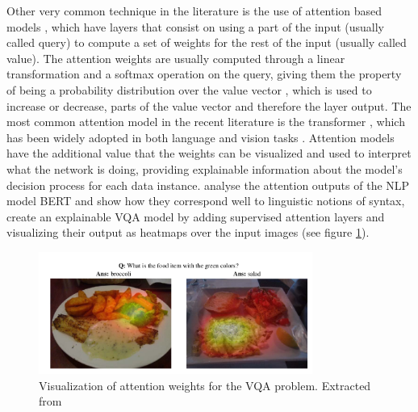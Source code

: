 Other very common technique in the literature is the use of attention based models \cite{bahdanau_attention},
which have layers that consist on using a part of the input (usually called query) to compute a set of weights
for the rest of the input (usually called value). The attention weights are usually computed through
a linear transformation and a softmax operation on the query, giving them the property of being a probability
distribution over the value vector \cite{cordonnier_relationship}, which is used to increase or decrease,
parts of the value vector and therefore the layer output. The most common attention model in the recent literature
is the transformer \cite{vaswani_attention}, which has been widely adopted in both language and vision tasks
\cite{devlin_bert, radford_gpt, bello_attention, li_visualbert, carion_object}. Attention models have the additional
value that the weights can be visualized and used to interpret what the network is doing, providing
explainable information about the model's decision process for each data instance.
 analyse the attention outputs of the NLP model BERT and show how they correspond
well to linguistic notions of syntax,  create an explainable VQA model by adding
supervised attention layers and visualizing their output as heatmaps over the input images
(see figure \ref{fig:vqa}).


\begin{figure}[ht]
	\begin{center}
	\includegraphics[width=0.8\textwidth]{./figures/soto.png}
	\caption[Attention on VQA]{Visualization of attention weights for the VQA problem. Extracted from  }
	\label{fig:vqa}
	\end{center}
\end{figure}

